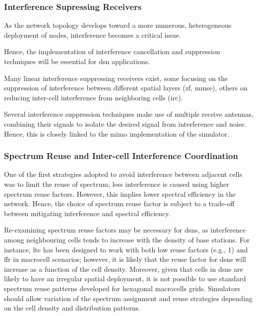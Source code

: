 \documentclass[conference]{IEEEtran}
\begin{document}
\subsubsection{Interference Supressing Receivers}\label{subsect:Interference_Supressing_Receivers}

As the network topology develops toward a more numerous, heterogeneous deployment of nodes, interference becomes a critical issue.

Hence, the implementation of interference cancellation and suppression techniques will be essential for \ac{dsn} applications.


Many linear interference suppressing receivers exist, some focusing on the suppression of interference between different spatial layers (\ac{zf}, \ac{mmse}), others on reducing inter-cell interference from neighboring cells (\ac{irc}).

Several interference suppression techniques make use of multiple receive antennas, combining their signals to isolate the desired signal from interference and noise. Hence, this is closely linked to the \ac{mimo} implementation of the simulator.


\subsubsection{Spectrum Reuse and Inter-cell Interference Coordination}\label{subsubsect:Spectrum_Reuse}

One of the first strategies adopted to avoid interference between adjacent cells was to limit the reuse of spectrum; less interference is caused using higher spectrum reuse factors. However, this implies lower spectral efficiency in the network. Hence, the choice of spectrum reuse factor is subject to a trade-off between mitigating interference and spectral efficiency.

Re-examining spectrum reuse factors may be necessary for \acp{dsn}, as interference among neighbouring cells tends to increase with the density of base stations.
For instance, \ac{lte} has been designed to work with both low reuse factors (e.g., 1) and \ac{ffr} in macrocell scenarios; however, it is likely that the reuse factor for \acp{dsn} will increase as a function of the cell density.
Moreover, given that cells in \acp{dsn} are likely to have an irregular spatial deployment, it is not possible to use standard spectrum reuse patterns developed for hexagonal macrocells grids.
Simulators should allow variation of the spectrum assignment and reuse strategies depending on the cell density and distribution patterns.
\end{document}
